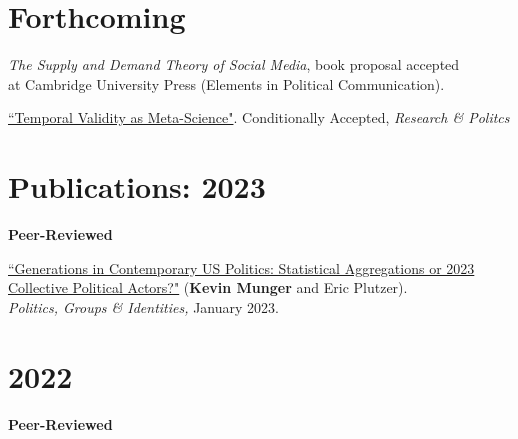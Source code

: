 \documentclass[margin]{res}
\begin{document}
\section{Forthcoming}

\textit{The Supply and Demand Theory of Social Media}, book proposal accepted\\ at Cambridge University Press (Elements in Political Communication).


\href{https://osf.io/uxwvq/}{``Temporal Validity as Meta-Science"}. Conditionally Accepted, \textit{Research \& Politcs}



\section{Publications: 2023} 	
\hfill

\textbf{Peer-Reviewed}


\href{https://www.tandfonline.com/doi/full/10.1080/21565503.2022.2159452}{``Generations in Contemporary US Politics:  Statistical Aggregations or \hfill 2023\\Collective Political Actors?"} (\textbf{Kevin Munger} and Eric Plutzer).\\ \textit{Politics, Groups \& Identities,} January 2023.


\section{2022} 	
\hfill

\textbf{Peer-Reviewed}
\end{document}
